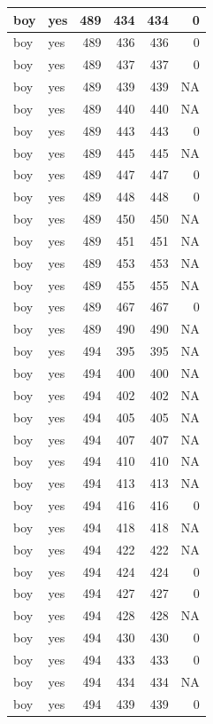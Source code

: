\documentclass[man]{apa6}
\begin{document}
\begin{tabular}{l|l|r|r|r|r}
\hline
boy & yes & 489 & 434 & 434 & 0\\
\hline
boy & yes & 489 & 436 & 436 & 0\\
\hline
boy & yes & 489 & 437 & 437 & 0\\
\hline
boy & yes & 489 & 439 & 439 & NA\\
\hline
boy & yes & 489 & 440 & 440 & NA\\
\hline
boy & yes & 489 & 443 & 443 & 0\\
\hline
boy & yes & 489 & 445 & 445 & NA\\
\hline
boy & yes & 489 & 447 & 447 & 0\\
\hline
boy & yes & 489 & 448 & 448 & 0\\
\hline
boy & yes & 489 & 450 & 450 & NA\\
\hline
boy & yes & 489 & 451 & 451 & NA\\
\hline
boy & yes & 489 & 453 & 453 & NA\\
\hline
boy & yes & 489 & 455 & 455 & NA\\
\hline
boy & yes & 489 & 467 & 467 & 0\\
\hline
boy & yes & 489 & 490 & 490 & NA\\
\hline
boy & yes & 494 & 395 & 395 & NA\\
\hline
boy & yes & 494 & 400 & 400 & NA\\
\hline
boy & yes & 494 & 402 & 402 & NA\\
\hline
boy & yes & 494 & 405 & 405 & NA\\
\hline
boy & yes & 494 & 407 & 407 & NA\\
\hline
boy & yes & 494 & 410 & 410 & NA\\
\hline
boy & yes & 494 & 413 & 413 & NA\\
\hline
boy & yes & 494 & 416 & 416 & 0\\
\hline
boy & yes & 494 & 418 & 418 & NA\\
\hline
boy & yes & 494 & 422 & 422 & NA\\
\hline
boy & yes & 494 & 424 & 424 & 0\\
\hline
boy & yes & 494 & 427 & 427 & 0\\
\hline
boy & yes & 494 & 428 & 428 & NA\\
\hline
boy & yes & 494 & 430 & 430 & 0\\
\hline
boy & yes & 494 & 433 & 433 & 0\\
\hline
boy & yes & 494 & 434 & 434 & NA\\
\hline
boy & yes & 494 & 439 & 439 & 0\\

\end{tabular}
\end{document}
